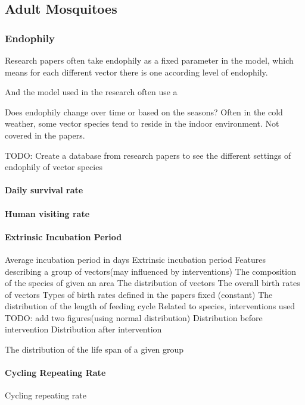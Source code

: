 \documentclass[a4paper, 12pt, twoside]{article}
\begin{document}
\subsection{Adult Mosquitoes}

\subsubsection{Endophily}
Research papers often take endophily as a fixed parameter in the model, which means for each different vector there is one according level of endophily.

And the model used in the research often use a 

Does endophily change over time or based on the seasons? Often in the cold weather, some vector species tend to reside in the indoor environment. Not covered in the papers.

TODO:
Create a database from research papers to see the different settings of endophily of vector species

\paragraph{Daily survival rate}

\paragraph{Human visiting rate}

\paragraph{Extrinsic Incubation Period}
Average incubation period in days
Extrinsic incubation period
Features describing a group of vectors(may influenced by interventions)
The composition of the species of given an area
The distribution of vectors
The overall birth rates of vectors
	Types of birth rates defined in the papers
fixed (constant)
The distribution of the length of feeding cycle
Related to species, interventions used
TODO: add two figures(using normal distribution)
Distribution before intervention
Distribution after intervention

The distribution of the life span of a given group

\paragraph{Cycling Repeating Rate}
Cycling repeating rate
\end{document}
